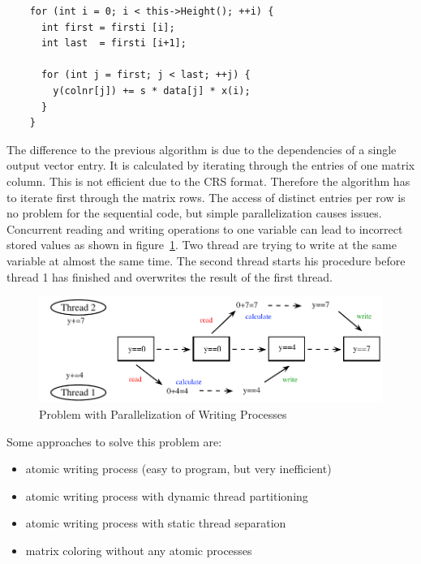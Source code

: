 \documentclass[a4paper,11pt]{scrartcl}
\begin{document}
\begin{lstlisting}
    for (int i = 0; i < this->Height(); ++i) {
      int first = firsti [i];
      int last  = firsti [i+1];

      for (int j = first; j < last; ++j) {
        y(colnr[j]) += s * data[j] * x(i);
      }
    }
\end{lstlisting}

The difference to the previous algorithm is due to the dependencies of a single
output vector entry. It is calculated by iterating through the entries
of one matrix column. This is not efficient due to the CRS format.
Therefore the algorithm has to iterate first through the matrix rows.
The access of distinct entries per row is no problem for the sequential
code, but simple parallelization causes issues.
Concurrent reading and writing operations to one variable can lead to incorrect
stored values as shown in figure~\ref{figure:parallelwriting}. Two
thread are trying to write at the same variable at almost the same time. The
second thread starts his procedure before thread 1 has finished and overwrites the
result of the first thread.

\begin{figure}[ht]
\includegraphics{graphic/parallel_writing_problem.pdf}
\caption{Problem with Parallelization of Writing Processes}\label{figure:parallelwriting}
\end{figure}

\begin{samepage}
Some approaches to solve this problem are:
\begin{itemize}
\item atomic writing process (easy to program, but very inefficient)
\item atomic writing process with dynamic thread partitioning
\item atomic writing process with static thread separation
\item matrix coloring without any atomic processes
\end{itemize}
\end{samepage}
\end{document}
